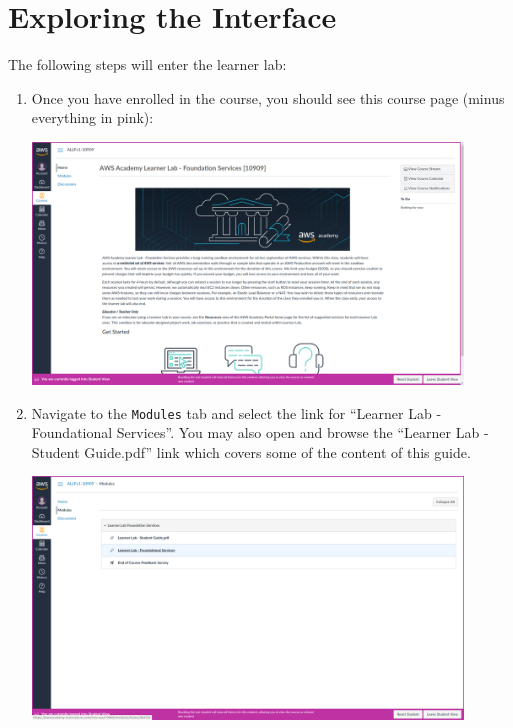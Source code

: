 \documentclass{csse4400}
\begin{document}
\section{Exploring the Interface}

The following steps will enter the learner lab:

\begin{enumerate}

\item Once you have enrolled in the course, you should see this course page (minus everything in pink):

\includegraphics[width=0.9\textwidth]{images/academy-homepage}

\item Navigate to the \texttt{Modules} tab and select the link for ``Learner Lab - Foundational Services''.
      You may also open and browse the ``Learner Lab - Student Guide.pdf'' link which covers some of the content of this guide.

\includegraphics[width=0.9\textwidth]{images/modules-page}


\end{enumerate}
\end{document}
